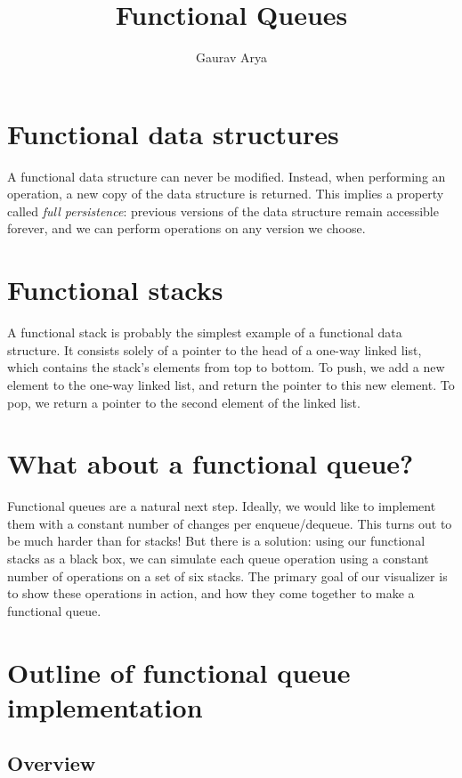 \documentclass[12.5pt]{scrartcl}
\author{Gaurav Arya}
\title{Functional Queues}
\begin{document}
\maketitle

\section{Functional data structures}

A functional data structure can never be modified. Instead, when performing an operation, a new copy of the data structure is returned. This implies a property called \emph{full persistence}: previous versions of the data structure remain accessible forever, and we can perform operations on any version we choose.

\section{Functional stacks}

A functional stack is probably the simplest example of a functional data structure. It consists solely of a pointer to the head of a one-way linked list, which contains the stack’s elements from top to bottom. To push, we add a new element to the one-way linked list, and return the pointer to this new element. To pop, we return a pointer to the second element of the linked list.

\section{What about a functional queue?}

Functional queues are a natural next step. Ideally, we would like to implement them with a constant number of changes per enqueue/dequeue. This turns out to be much harder than for stacks! But there is a solution: using our functional stacks as a black box, we can simulate each queue operation using a constant number of operations on a set of six stacks. The primary goal of our visualizer is to show these operations in action, and how they come together to make a functional queue.

\section{Outline of functional queue implementation}

\subsection{Overview}
\end{document}
